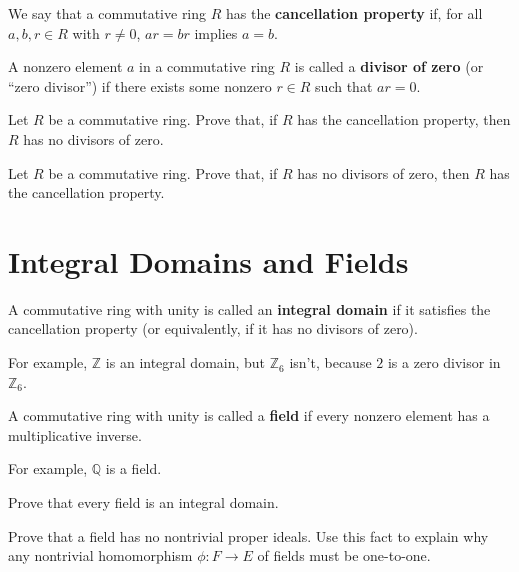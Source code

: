 \begin{definition}
We say that a commutative ring \(R\) has the \textbf{cancellation property} if, for all \(a, b, r \in R\) with \(r\neq 0\), \(ar = br\) implies \(a = b\).
\end{definition}

\begin{definition}
A nonzero element \(a\) in a commutative ring \(R\) is called a \textbf{divisor of zero} (or ``zero divisor'') if there exists some nonzero \(r \in R\) such that \(ar = 0\).
\end{definition}

\begin{problem}
Let \(R\) be a commutative ring. Prove that, if \(R\) has the cancellation property, then \(R\) has no divisors of zero.
\end{problem}

\begin{problem}
Let \(R\) be a commutative ring. Prove that, if \(R\) has no divisors of zero, then \(R\) has the cancellation property.
\end{problem}

\section{Integral Domains and Fields}

\begin{definition}
A commutative ring with unity is called an \textbf{integral domain} if it satisfies the cancellation property (or equivalently, if it has no divisors of zero).
\end{definition}

For example, \(\mathbb{Z}\) is an integral domain, but \(\mathbb{Z}_6\) isn't, because \(2\) is a zero divisor in \(\mathbb{Z}_6\).

\begin{definition}
A commutative ring with unity is called a \textbf{field} if every nonzero element has a multiplicative inverse.
\end{definition}

For example, \(\mathbb{Q}\) is a field.

\begin{problem}
Prove that every field is an integral domain.
\end{problem}

\begin{problem}\label{prob:noideal}
Prove that a field has no nontrivial proper ideals. Use this fact to explain why any nontrivial homomorphism \(\phi: F \longrightarrow E\) of fields must be one-to-one.
\end{problem}

